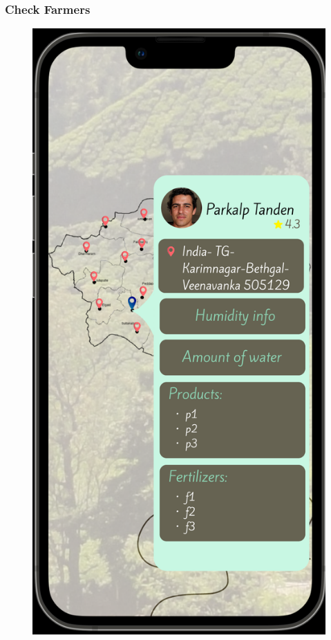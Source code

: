 \subsubsection{Check Farmers}
    \begin{figure}[ht]
        \centering
        \includegraphics[width = 0.5\linewidth]{figures/chooseFarmer.png}
        \label{fig:profile}
    \end{figure}
\clearpage

